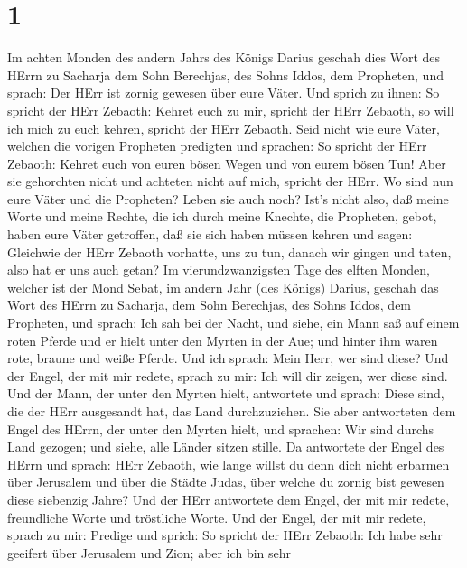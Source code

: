 \hypertarget{section}{%
\section{1}\label{section}}

 Im achten Monden des andern Jahrs des Königs Darius geschah
dies Wort des HErrn zu Sacharja dem Sohn Berechjas, des Sohns Iddos, dem
Propheten, und sprach:  Der HErr ist zornig gewesen über
eure Väter.  Und sprich zu ihnen: So spricht der HErr
Zebaoth: Kehret euch zu mir, spricht der HErr Zebaoth, so will ich mich
zu euch kehren, spricht der HErr Zebaoth.  Seid nicht wie
eure Väter, welchen die vorigen Propheten predigten und sprachen: So
spricht der HErr Zebaoth: Kehret euch von euren bösen Wegen und von
eurem bösen Tun! Aber sie gehorchten nicht und achteten nicht auf mich,
spricht der HErr.  Wo sind nun eure Väter und die Propheten?
Leben sie auch noch?  Ist's nicht also, daß meine Worte und
meine Rechte, die ich durch meine Knechte, die Propheten, gebot, haben
eure Väter getroffen, daß sie sich haben müssen kehren und sagen:
Gleichwie der HErr Zebaoth vorhatte, uns zu tun, danach wir gingen und
taten, also hat er uns auch getan?  Im vierundzwanzigsten
Tage des elften Monden, welcher ist der Mond Sebat, im andern Jahr (des
Königs) Darius, geschah das Wort des HErrn zu Sacharja, dem Sohn
Berechjas, des Sohns Iddos, dem Propheten, und sprach:  Ich
sah bei der Nacht, und siehe, ein Mann saß auf einem roten Pferde und er
hielt unter den Myrten in der Aue; und hinter ihm waren rote, braune und
weiße Pferde.  Und ich sprach: Mein Herr, wer sind diese?
Und der Engel, der mit mir redete, sprach zu mir: Ich will dir zeigen,
wer diese sind.  Und der Mann, der unter den Myrten hielt,
antwortete und sprach: Diese sind, die der HErr ausgesandt hat, das Land
durchzuziehen.  Sie aber antworteten dem Engel des HErrn,
der unter den Myrten hielt, und sprachen: Wir sind durchs Land gezogen;
und siehe, alle Länder sitzen stille.  Da antwortete der
Engel des HErrn und sprach: HErr Zebaoth, wie lange willst du denn dich
nicht erbarmen über Jerusalem und über die Städte Judas, über welche du
zornig bist gewesen diese siebenzig Jahre?  Und der HErr
antwortete dem Engel, der mit mir redete, freundliche Worte und
tröstliche Worte.  Und der Engel, der mit mir redete,
sprach zu mir: Predige und sprich: So spricht der HErr Zebaoth: Ich habe
sehr geeifert über Jerusalem und Zion;  aber ich bin sehr
